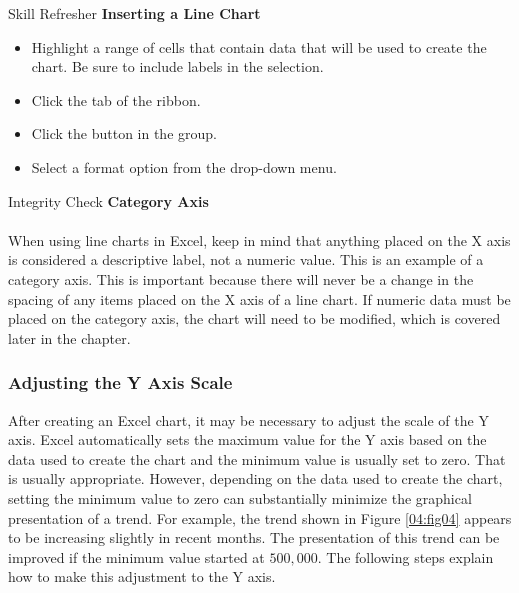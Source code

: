 \begin{center}
	\begin{sklbox}{Skill Refresher}
		\textbf{Inserting a Line Chart}
		\\
		\begin{itemize}
			\setlength{\itemsep}{0pt}
			\setlength{\parskip}{0pt}
			\setlength{\parsep}{0pt}

			\item Highlight a range of cells that contain data that will be used to create the chart. Be sure to include labels in the selection.
			\item Click the  tab of the ribbon.
			\item Click the  button in the  group.
			\item Select a format option from the  drop-down menu.
			
		\end{itemize}
	\end{sklbox}
\end{center}

\begin{center}
	\begin{infobox}{Integrity Check}
		\textbf{Category Axis}
		\\
		\\
		When using line charts in Excel, keep in mind that anything placed on the X axis is considered a descriptive label, not a numeric value. This is an example of a category axis. This is important because there will never be a change in the spacing of any items placed on the X axis of a line chart. If numeric data must be placed on the category axis, the chart will need to be modified, which is covered later in the chapter.		
	\end{infobox}
\end{center}

\subsubsection{Adjusting the Y Axis Scale}

After creating an Excel chart, it may be necessary to adjust the scale of the Y axis. Excel automatically sets the maximum value for the Y axis based on the data used to create the chart and the minimum value is usually set to zero. That is usually appropriate. However, depending on the data used to create the chart, setting the minimum value to zero can substantially minimize the graphical presentation of a trend. For example, the trend shown in Figure \ref{04:fig04} appears to be increasing slightly in recent months. The presentation of this trend can be improved if the minimum value started at $ 500,000 $. The following steps explain how to make this adjustment to the Y axis.

